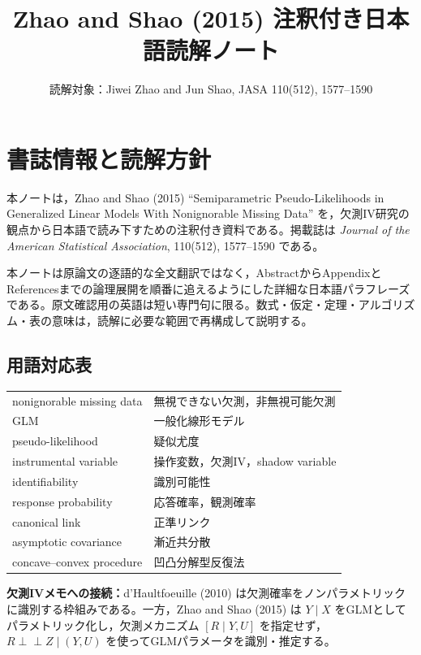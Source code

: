 \documentclass[dvipdfmx,autodetect-engine]{jsarticle}
\title{Zhao and Shao (2015) 注釈付き日本語読解ノート}
\author{読解対象：Jiwei Zhao and Jun Shao, JASA 110(512), 1577--1590}
\date{}
\newcommand{\indep}{\mathrel{\perp\!\!\!\perp}}
\newcommand{\connect}[1]{\par\smallskip\noindent\textbf{欠測IVメモへの接続：}#1\par\smallskip}
\begin{document}
\maketitle

\section*{書誌情報と読解方針}

本ノートは，Zhao and Shao (2015) ``Semiparametric Pseudo-Likelihoods in Generalized Linear Models With Nonignorable Missing Data'' を，欠測IV研究の観点から日本語で読み下すための注釈付き資料である。掲載誌は \textit{Journal of the American Statistical Association}, 110(512), 1577--1590 である。

本ノートは原論文の逐語的な全文翻訳ではなく，AbstractからAppendixとReferencesまでの論理展開を順番に追えるようにした詳細な日本語パラフレーズである。原文確認用の英語は短い専門句に限る。数式・仮定・定理・アルゴリズム・表の意味は，読解に必要な範囲で再構成して説明する。

\subsection*{用語対応表}

\begin{center}
\begin{tabular}{ll}
nonignorable missing data & 無視できない欠測，非無視可能欠測 \\
GLM & 一般化線形モデル \\
pseudo-likelihood & 疑似尤度 \\
instrumental variable & 操作変数，欠測IV，shadow variable \\
identifiability & 識別可能性 \\
response probability & 応答確率，観測確率 \\
canonical link & 正準リンク \\
asymptotic covariance & 漸近共分散 \\
concave--convex procedure & 凹凸分解型反復法 \\
\end{tabular}
\end{center}

\connect{d'Haultfoeuille (2010) は欠測確率をノンパラメトリックに識別する枠組みである。一方，Zhao and Shao (2015) は $Y\mid X$ をGLMとしてパラメトリック化し，欠測メカニズム $[R\mid Y,U]$ を指定せず，$R\indep Z\mid (Y,U)$ を使ってGLMパラメータを識別・推定する。}
\end{document}
